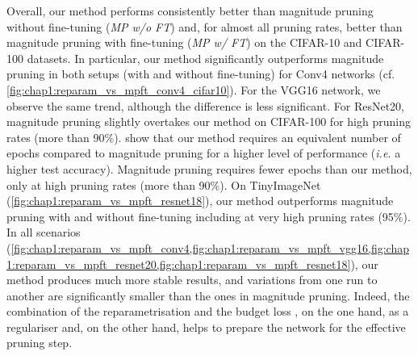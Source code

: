 Overall, our method performs consistently better than magnitude pruning without
fine-tuning (\emph{MP w/o FT}) and, for almost all pruning rates, better than
magnitude pruning with fine-tuning (\emph{MP w/ FT}) on the CIFAR-10 and
CIFAR-100 datasets. In particular, our method significantly outperforms
magnitude pruning in both setups (with and without fine-tuning) for Conv4
networks (cf. \cref{fig:chap1:reparam_vs_mpft_conv4_cifar10}). For the VGG16
network, we observe the same trend, although the difference is less significant.
For ResNet20, magnitude pruning slightly overtakes our method on CIFAR-100 for
high pruning rates (more than 90\%).
show that our method requires an equivalent number of epochs compared to
magnitude pruning for a higher level of performance (\textit{i.e.} a higher test
accuracy). Magnitude pruning requires fewer epochs than our method, only at high
pruning rates (more than 90\%). On TinyImageNet
(\cref{fig:chap1:reparam_vs_mpft_resnet18}), our method outperforms magnitude
pruning with and without fine-tuning including at very high pruning rates
(95\%). In all scenarios
(\cref{fig:chap1:reparam_vs_mpft_conv4,fig:chap1:reparam_vs_mpft_vgg16,fig:chap1:reparam_vs_mpft_resnet20,fig:chap1:reparam_vs_mpft_resnet18}),
our method produces much more stable results, and variations from one run to
another are significantly smaller than the ones in magnitude pruning. Indeed,
the combination of the reparametrisation and the budget loss \DIFdelbegin {}\DIFdelend \DIFaddbegin {}\DIFaddend , on the one
hand, as a regulariser and, on the other hand, helps to prepare the network for
the effective pruning step.\\

